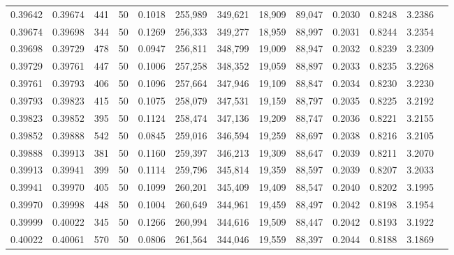 \begin{tabular}{rrrrrrrrrrrrr}
0.39642 & 0.39674 &   441 &  50 &                                     0.1018 & 255,989 & 349,621 &  18,909 &  89,047 & 0.2030 & 0.8248 & 3.2386 \\
0.39674 & 0.39698 &   344 &  50 &                                     0.1269 & 256,333 & 349,277 &  18,959 &  88,997 & 0.2031 & 0.8244 & 3.2354 \\
0.39698 & 0.39729 &   478 &  50 &                                     0.0947 & 256,811 & 348,799 &  19,009 &  88,947 & 0.2032 & 0.8239 & 3.2309 \\
0.39729 & 0.39761 &   447 &  50 &                                     0.1006 & 257,258 & 348,352 &  19,059 &  88,897 & 0.2033 & 0.8235 & 3.2268 \\
0.39761 & 0.39793 &   406 &  50 &                                     0.1096 & 257,664 & 347,946 &  19,109 &  88,847 & 0.2034 & 0.8230 & 3.2230 \\
0.39793 & 0.39823 &   415 &  50 &                                     0.1075 & 258,079 & 347,531 &  19,159 &  88,797 & 0.2035 & 0.8225 & 3.2192 \\
0.39823 & 0.39852 &   395 &  50 &                                     0.1124 & 258,474 & 347,136 &  19,209 &  88,747 & 0.2036 & 0.8221 & 3.2155 \\
0.39852 & 0.39888 &   542 &  50 &                                     0.0845 & 259,016 & 346,594 &  19,259 &  88,697 & 0.2038 & 0.8216 & 3.2105 \\
0.39888 & 0.39913 &   381 &  50 &                                     0.1160 & 259,397 & 346,213 &  19,309 &  88,647 & 0.2039 & 0.8211 & 3.2070 \\
0.39913 & 0.39941 &   399 &  50 &                                     0.1114 & 259,796 & 345,814 &  19,359 &  88,597 & 0.2039 & 0.8207 & 3.2033 \\
0.39941 & 0.39970 &   405 &  50 &                                     0.1099 & 260,201 & 345,409 &  19,409 &  88,547 & 0.2040 & 0.8202 & 3.1995 \\
0.39970 & 0.39998 &   448 &  50 &                                     0.1004 & 260,649 & 344,961 &  19,459 &  88,497 & 0.2042 & 0.8198 & 3.1954 \\
0.39999 & 0.40022 &   345 &  50 &                                     0.1266 & 260,994 & 344,616 &  19,509 &  88,447 & 0.2042 & 0.8193 & 3.1922 \\
0.40022 & 0.40061 &   570 &  50 &                                     0.0806 & 261,564 & 344,046 &  19,559 &  88,397 & 0.2044 & 0.8188 & 3.1869 \\

\end{tabular}
